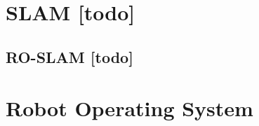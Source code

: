 \begin{comment}
------------------------------------------------------------------------------------------
Embodied Localisation and Mapping
http://elib.suub.uni-bremen.de/edocs/00103537-1.pdf

"C:\Users\Albert\Documents\Studium\Bachelor WS17\scientific publication\Efficient probabilistic range-only SLAM.ppt"


- \citez{montemerlo2002fastslam}
	- FastSLAM: A factored solution to the simultaneous localization and mapping problem

- \cite{sarkka2013bayesian}
	- Bayesian filtering and smoothing
- \cite{kurth2003experimental}
	- The Kalman Filter approach described in Section 5 can be reformulated for the SLAM problem. To perform SLAM, we include position estimates for each tag in the state, producing a state vector of the form: q(k) = [xk; yk; k; xb1; yb1 ; :::; xbn; ybn]T , where n is the number of beacons.
	
- The purpose of a probabilistic approach to RO-SLAM is to obtain the joint probability distribution of the robot pose (or path) and the map, given all the available data at some instant of time. This distribution represents our knowledge about the robot path, the map, and all their correlations.
\end{comment}
%
%
%
\section{SLAM [todo]}



%
%
%
\subsection{RO-SLAM [todo]}


%
%
\section{Robot Operating System}


